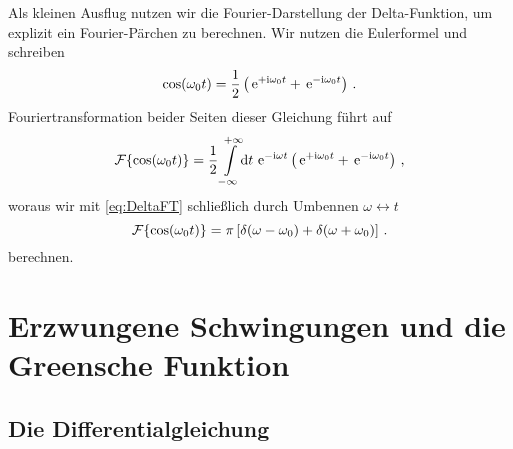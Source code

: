 \documentclass[paper=a4, fontsize=11.0pt, abstractoff, DIV12]{scrartcl}
\begin{document}
Als kleinen Ausflug nutzen wir die Fourier-Darstellung der Delta-Funktion,
um explizit ein Fourier-Pärchen zu berechnen.
Wir nutzen die Eulerformel und schreiben
\begin{equation}
\cos(\omega_0 t) = \frac{1}{2}\left(\,{\mathrm{e}}^{+\mathrm{i}\omega_0t} + \,{\mathrm{e}}^{-\mathrm{i}\omega_0 t}\right)\,.
\end{equation}
Fouriertransformation beider Seiten dieser Gleichung führt auf
\begin{equation}
\operatorname{\mathcal{F}}\{\cos(\omega_0t)\} = \frac{1}{2} \int\limits_{-\infty}^{+\infty}\!\mathrm{d} t\, \,{\mathrm{e}}^{-\mathrm{i}\omega t}\left( \,{\mathrm{e}}^{+\mathrm{i}\omega_0 t}+\,{\mathrm{e}}^{-\mathrm{i}\omega_0 t}\right)\,,
\end{equation}
woraus wir mit \eqref{eq:DeltaFT} schließlich durch Umbennen $\omega
\leftrightarrow t$
\begin{equation}
\operatorname{\mathcal{F}}\{ \cos(\omega_0 t) \} = \pi\left[\delta(\omega-\omega_0) + \delta(\omega+\omega_0)\right]\,.
\end{equation}
berechnen.


\section{Erzwungene Schwingungen und die Greensche Funktion}

\subsection{Die Differentialgleichung}
\end{document}
